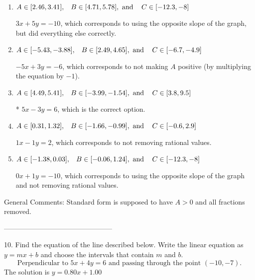 \documentclass{article}[14pt]
\begin{document}
\begin{enumerate}[label=\Alph*.] 
\item $ A \in [2.46, 3.41], \hspace{3mm} B \in [4.71, 5.78], \text{ and } \hspace{3mm} C \in [-12.3, -8] $ 

  $3x + 5y = -10$, which corresponds to using the opposite slope of the graph, but did everything else correctly. 
\item $ A \in [-5.43, -3.88], \hspace{3mm} B \in [2.49, 4.65], \text{ and } \hspace{3mm} C \in [-6.7, -4.9] $ 

  $-5x + 3y = -6$, which corresponds to not making $A$ positive (by multiplying the equation by $-1$). 
\item $ A \in [4.49, 5.41], \hspace{3mm} B \in [-3.99, -1.54], \text{ and } \hspace{3mm} C \in [3.8, 9.5] $ 

 * $5x - 3y = 6$, which is the correct option. 
\item $ A \in [0.31, 1.32], \hspace{3mm} B \in [-1.66, -0.99], \text{ and } \hspace{3mm} C \in [-0.6, 2.9] $ 

  $1x - 1y = 2$, which corresponds to not removing rational values. 
\item $ A \in [-1.38, 0.03], \hspace{3mm} B \in [-0.06, 1.24], \text{ and } \hspace{3mm} C \in [-12.3, -8] $ 

  $0x + 1y = -10$, which corresponds to using the opposite slope of the graph and not removing rational values. 
\end{enumerate} 
 
General Comments: Standard form is supposed to have $A > 0$ and all fractions removed.

-----------------------------------------------

10. Find the equation of the line described below. Write the linear equation as $ y=mx+b $ and choose the intervals that contain $m$ and $b$.
$$ \text{Perpendicular to } 5 x + 4 y = 6 \text{ and passing through the point } (-10, -7). $$ 
The solution is $ y = 0.80x + 1.00 $ 
\end{document}
